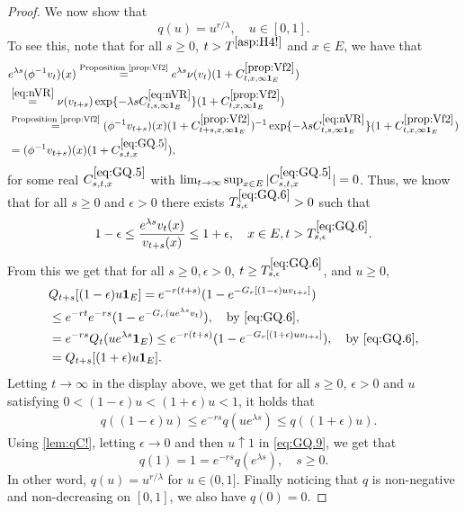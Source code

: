 \documentclass[12pt,a4paper]{amsart}
\numberwithin{equation}{section}
\theoremstyle{plain}
\theoremstyle{definition}
\theoremstyle{remark}
\begin{document}
\begin{proof}
	We now show that
\begin{equation} \label{eq:GQ}
	q(u) = u^{r/\lambda},\quad u\in [0,1].
\end{equation}
	To see this, note that for all $s\geq 0$, $t>T^{\eqref{asp:H4!}}$ and $x\in E$, we have that
	\begin{align}
	& e^{\lambda s}(\phi^{-1}v_t)(x)
	\overset{\text{Proposition \ref{prop:Vf2}}}= e^{\lambda s}\nu(v_{t})(1+ C^{\ref{prop:Vf2}}_{t,x,\infty  \mathbf 1_E})
	\\&\overset{\eqref{eq:nVR}}=\nu(v_{t+s}) \exp\{-\lambda sC^{\eqref{eq:nVR}}_{t,s,\infty \mathbf 1_E}\} (1+ C^{\ref{prop:Vf2}}_{t,x,\infty  \mathbf 1_E})
	\\&\overset{\text{Proposition \ref{prop:Vf2}}}= (\phi^{-1}v_{t+s})(x) (1+ C^{\ref{prop:Vf2}}_{t+s,x,\infty \mathbf 1_E})^{-1} \exp\{-\lambda sC^{\eqref{eq:nVR}}_{t,s,\infty  \mathbf 1_E}\} (1+ C^{\ref{prop:Vf2}}_{t,x,\infty  \mathbf 1_E})
	\\& \label{eq:GQ.5}= (\phi^{-1}v_{t+s})(x) (1+C_{s,t,x}^{\eqref{eq:GQ.5}}),
	\end{align}
	for some real $C_{s,t,x}^{\eqref{eq:GQ.5}}$ with $\lim_{t\to \infty}\sup_{x\in E} |C_{s,t,x}^{\eqref{eq:GQ.5}}| =0$.
	Thus, we know that for all $s\geq 0$ and $\epsilon >0$ there exists $T^{\eqref{eq:GQ.6}}_{s,\epsilon}>0$ such that
	\begin{equation} \label{eq:GQ.6}
	1-\epsilon
	\leq \frac{e^{\lambda s}v_t(x)}{v_{t+s}(x)}
	\leq 1+\epsilon,
	\quad x\in E, t> T^{\eqref{eq:GQ.6}}_{s,\epsilon}.
	\end{equation}
	From this we get that for all $s\geq 0, \epsilon > 0$, $t\ge T^{\eqref{eq:GQ.6}}_{s,\epsilon}$, and $u\geq 0$,
	\begin{align}
	& Q_{t+s}[ (1-\epsilon)u \mathbf 1_E ]
	= e^{-r (t+s)}( 1-e^{-G_r[(1-\epsilon)uv_{t+s}]} )
	\\ & \leq e^{-r t} e^{-r s}( 1- e^{-G_r(ue^{\lambda s}v_t)} ),\quad\text{by \eqref{eq:GQ.6}},
	\\\label{eq:GQ.7}&= e^{-r s}Q_t(ue^{\lambda s}  \mathbf 1_E)
	\leq e^{-r(t+s)}( 1-e^{-G_r[(1+\epsilon)uv_{t+s}]} ),\quad\text{by \eqref{eq:GQ.6}},
	\\\label{eq:GQ.8}&= Q_{t+s}[ (1+\epsilon)u \mathbf 1_E ].
	\end{align}
	Letting $t\to \infty$ in the display above, we get that for all $s\geq 0$, $\epsilon > 0$ and $u$ satisfying $0 < (1 - \epsilon) u < (1+\epsilon)u < 1$, it holds that
\begin{align} \label{eq:GQ.9}
	& q((1-\epsilon)u)
	\leq e^{-r s}q(u e^{\lambda s})
	\leq q((1+\epsilon)u).
\end{align}
	Using \eqref{lem:qC!}, letting $\epsilon \to 0$ and then $u \uparrow 1$ in \eqref{eq:GQ.9}, we get that
\[
	q(1)
	=1
	= e^{- r s} q(e^{\lambda s}),
	\quad s \geq 0.
\]
	In other word, $q(u) = u^{r/\lambda}$ for $u\in (0,1]$.
	Finally noticing that $q$ is non-negative and non-decreasing on $[0,1]$, we also have $q(0) = 0$.


\end{proof}
\end{document}
